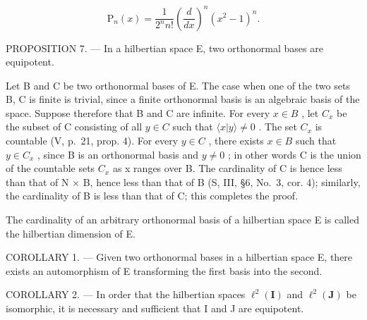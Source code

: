 \[
\mathrm{P} _ {n} (x) = \frac {1}{2 ^ {n} n !} \left(\frac {d}{d x}\right) ^ {n} (x ^ {2} - 1) ^ {n}.
\]

PROPOSITION 7. --- In a hilbertian space E, two orthonormal bases are equipotent.

Let B and C be two orthonormal bases of E. The case when one of the two sets B, C is finite is trivial, since a finite orthonormal basis is an algebraic basis of the space. Suppose therefore that B and C are infinite. For every \(x \in B\) , let \(C_{x}\) be the subset of C consisting of all \(y \in C\) such that \(\langle x | y \rangle \neq 0\) . The set \(C_{x}\) is countable (V, p.~21, prop. 4). For every \(y \in C\) , there exists \(x \in B\) such that \(y \in C_{x}\) , since B is an orthonormal basis and \(y \neq 0\) ; in other words C is the union of the countable sets \(C_{x}\) as x ranges over B. The cardinality of C is hence less than that of N × B, hence less than that of B (S, III, §6, No.~3, cor. 4); similarly, the cardinality of B is less than that of C; this completes the proof.

The cardinality of an arbitrary orthonormal basis of a hilbertian space E is called the hilbertian dimension of E.

COROLLARY 1. --- Given two orthonormal bases in a hilbertian space E, there exists an automorphism of E transforming the first basis into the second.

COROLLARY 2. --- In order that the hilbertian spaces \(\ell^2 (\mathbf{I})\) and \(\ell^2 (\mathbf{J})\) be isomorphic, it is necessary and sufficient that I and J are equipotent.

